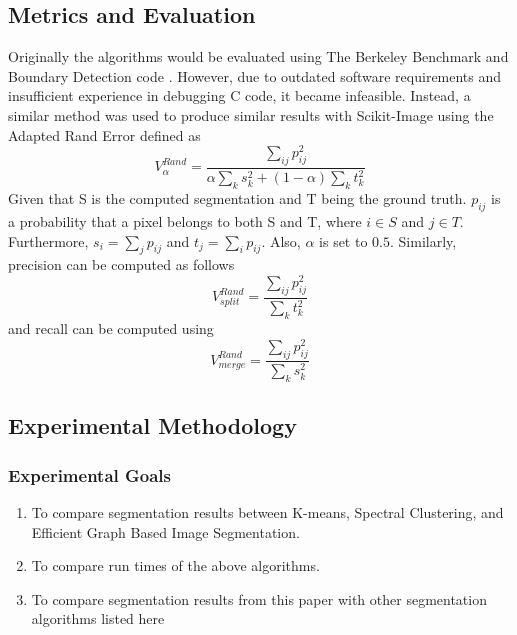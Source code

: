 \documentclass[12pt]{extarticle}
\begin{document}
  \subsection{Metrics and Evaluation}
    Originally the algorithms would be evaluated using The Berkeley Benchmark
    and Boundary Detection code \cite{dataset}. However, due to outdated software
    requirements and insufficient experience in debugging C code, it became
    infeasible. Instead, a similar method was used to produce similar results
    with Scikit-Image using the Adapted Rand Error defined as \cite{error}
    \begin{equation}
      V_\alpha ^{Rand} =
      \frac{\sum_{ij} p_{ij}^2}{\alpha \sum_{k} s_{k}^2 +
      (1-\alpha) \sum_{k} t_{k}^2}
    \end{equation}
    Given that S is the computed segmentation and T being the ground truth.
    $p_{ij}$ is a probability that a pixel belongs to both S and T, where $i \in S$
    and $j \in T$. Furthermore, $s_i = \sum_{j} p_{ij}$ and $t_j = \sum_{i} p_{ij}$.
    Also, $\alpha$ is set to $0.5$. Similarly, precision can be computed as follows
    \begin{equation}
      V_{split} ^{Rand} =
      \frac{\sum_{ij} p_{ij}^2}{\sum_{k} t_{k}^2}
    \end{equation}
    and recall can be computed using
    \begin{equation}
      V_{merge} ^{Rand} =
      \frac{\sum_{ij} p_{ij}^2}{\sum_{k} s_{k}^2}
    \end{equation}

  \subsection{Experimental Methodology}

    \subsubsection{Experimental Goals}
      \begin{enumerate}
        \item To compare segmentation results between K-means, Spectral Clustering,
          and Efficient Graph Based Image Segmentation.
        \item To compare run times of the above algorithms.
        \item To compare segmentation results from this paper with other
          segmentation algorithms listed here \cite{dataset}
      \end{enumerate}
\end{document}
